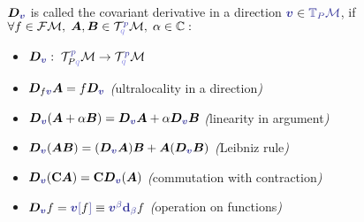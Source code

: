 \begin{definition}
\label{def:covariantDerivative}
    $\bm D_{\bluee{\bm v}}$ is called the covariant derivative in a direction $\bluee{\bm v} \in \bluee{\T_P\M}$, if $\forall f\in\FM, \; \bm A,\bm B\in \TT^{\bluee p}_{\blueee q} \M,\; \alpha\in\C: $
    \begin{itemize}
        \item $\bm D_{\bluee{\bm v}}:\; \TT^{\bluee p}_{P\blueee q} \M \rightarrow {\TT}^{\bluee p}_{\blueee q} \M$
        \item $\bm D_{f\bluee{\bm v}}\bm A=f\bm D_{\bluee{\bm v}} $ \emph(ultralocality in a direction\emph)
        \item $\bm D_{\bluee{\bm v}}(\bm A+\alpha \bm B)=\bm D_{\bluee{\bm v}}\bm A+\alpha\bm D_{\bluee{\bm v}}\bm B$ \emph(linearity in argument\emph)
        \item $\bm D_{\bluee{\bm v}}(\bm{AB})=(\bm D_{\bluee{\bm v}}\bm A)\bm B+\bm A(\bm D_{\bluee{\bm v}}\bm B)$ \emph(Leibniz rule\emph)
        \item $\bm D_{\bluee{\bm v}}(\mathbf C \bm A)=\mathbf C \bm D_{\bluee{\bm v}}(\bm A)$ \emph(commutation with contraction\emph)
        \item $\bm D_{\bluee{\bm v}}f=\bluee{\bm v[}f\bluee ]\equiv\bluee{\bm v^\beta \bm \d_\beta} f$ \emph(operation on functions\emph)
    \end{itemize}
\end{definition}


    

